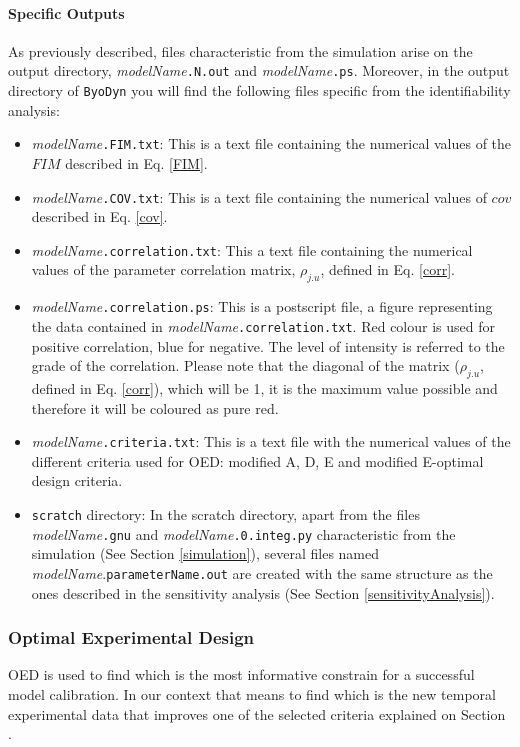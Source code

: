 \documentclass[a4paper, 11pt]{article}
\begin{document}
\paragraph{Specific Outputs}
As previously described, files characteristic from the simulation arise on the output directory, \textit{modelName}\texttt{.N.out} and \textit{modelName}\texttt{.ps}.
Moreover, in the output directory of \texttt{ByoDyn} you will find the following files specific from the identifiability analysis:
\begin{itemize}
  \item \textit{modelName}\texttt{.FIM.txt}:
    This is a text file containing the numerical values of the $FIM$ described in Eq. \ref{FIM}.
  \item \textit{modelName}\texttt{.COV.txt}:
    This is a text file containing the numerical values of $cov$ described in Eq. \ref{cov}.
  \item \textit{modelName}\texttt{.correlation.txt}:
    This a text file containing the numerical values of the parameter correlation matrix, $\rho_{j.u}$, defined in Eq. \ref{corr}.
  \item \textit{modelName}\texttt{.correlation.ps}:
    This is a postscript file, a figure representing the data contained in \textit{modelName}\texttt{.correlation.txt}.
    Red colour is used for positive correlation, blue for negative. 
    The level of intensity is referred to the grade of the correlation.
    Please note that the diagonal of the matrix ($\rho_{j.u}$, defined in Eq. \ref{corr}), which will be 1, it is the maximum value possible and therefore it will be coloured as pure red.
  \item \textit{modelName}\texttt{.criteria.txt}:
    This is a text file with the numerical values of the different criteria used for OED: modified A, D, E and modified E-optimal design criteria.  
  \item \texttt{scratch} directory:
    In the scratch directory, apart from the files \textit{modelName}\texttt{.gnu} and \textit{modelName}\texttt{.0.integ.py} characteristic from the simulation (See Section \ref{simulation}), several files named \textit{modelName}.\texttt{parameterName.out} are created with the same structure as the ones described in the sensitivity analysis (See Section \ref{sensitivityAnalysis}).
\end{itemize}
\subsubsection{Optimal Experimental Design} \label{oed}
OED is used to find which is the most informative constrain for a successful model calibration.
In our context that means to find which is the new temporal experimental data that improves one of the selected criteria explained on Section \label{identifiability}.
\end{document}
